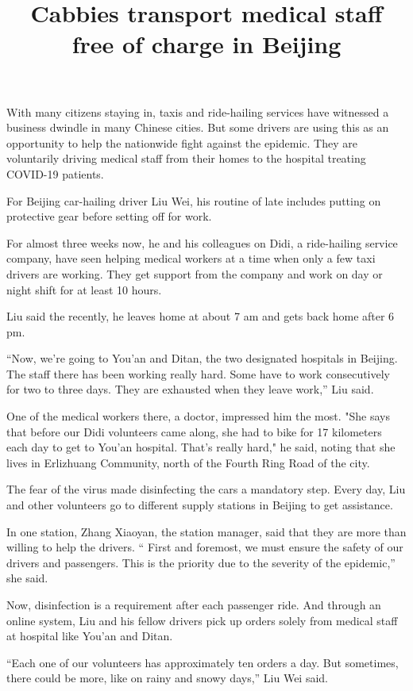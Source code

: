 \documentclass{article}
\begin{document}
\title{Cabbies transport medical staff free of charge in Beijing}

\maketitle

With many citizens staying in, taxis and ride-hailing services have witnessed a business dwindle in many Chinese cities. But some drivers are using this as an opportunity to help the nationwide fight against the epidemic. They are voluntarily driving medical staff from their homes to the hospital treating COVID-19 patients.

For Beijing car-hailing driver Liu Wei, his routine of late includes putting on protective gear before setting off for work.

For almost three weeks now, he and his colleagues on Didi, a ride-hailing service company, have seen helping medical workers at a time when only a few taxi drivers are working. They get support from the company and work on day or night shift for at least 10 hours.

Liu said the recently, he leaves home at about 7 am and gets back home after 6 pm. 

``Now, we're going to You'an and Ditan, the two designated hospitals in Beijing. The staff there has been working really hard. Some have to work consecutively for two to three days. They are exhausted when they leave work,'' Liu said.

One of the medical workers there, a doctor, impressed him the most. "She says that before our Didi volunteers came along, she had to bike for 17 kilometers each day to get to You'an hospital. That's really hard," he said, noting that she lives in Erlizhuang Community, north of the Fourth Ring Road of the city.

The fear of the virus made disinfecting the cars a mandatory step. Every day, Liu and other volunteers go to different supply stations in Beijing to get assistance.

In one station, Zhang Xiaoyan, the station manager, said that they are more than willing to help the drivers. `` First and foremost, we must ensure the safety of our drivers and passengers. This is the priority due to the severity of the epidemic,'' she said.

Now, disinfection is a requirement after each passenger ride. And through an online system, Liu and his fellow drivers pick up orders solely from medical staff at hospital like You'an and Ditan.

``Each one of our volunteers has approximately ten orders a day. But sometimes, there could be more, like on rainy and snowy days,'' Liu Wei said.
\end{document}
